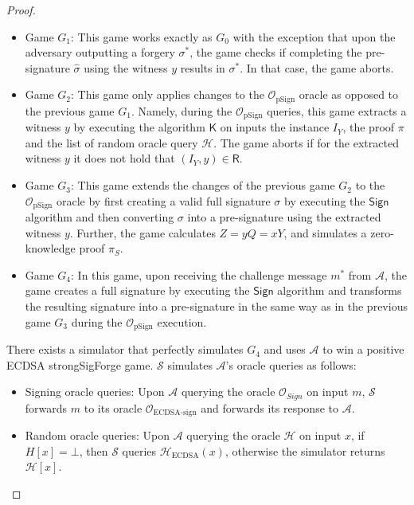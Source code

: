 \documentclass{llncs}
\begin{document}
\begin{proof}
\begin{itemize}
\item Game $G_1$: This game works exactly as $G_0$ with the exception that upon the adversary outputting a forgery $\sigma^*$, the game checks if completing the pre-signature $\hat{\sigma}$ using the witness $y$ results in $\sigma^*$. In that case, the game aborts. 

\item Game $G_2$: This game only applies changes to the $\mathcal{O}_{\text{pSign}}$ oracle as opposed to the previous game $G_1$. Namely, during the $\mathcal{O}_{\text{pSign}}$ queries, this game extracts a witness $y$ by executing the algorithm $\mathsf{K}$ on inputs the instance $I_Y$, the proof $\pi$ and the list of random oracle query $\mathcal{H}$. The game aborts if for the extracted witness $y$ it does not hold that $(I_Y, y) \in \mathsf{R}$.

\item Game $G_3$: This game extends the changes of the previous game $G_2$ to the $\mathcal{O}_{\text{pSign}}$ oracle by first creating a valid full signature $\sigma$ by executing the $\mathsf{Sign}$ algorithm and then converting $\sigma$ into a pre-signature using the extracted witness $y$. Further, the game calculates $Z=yQ=xY$, and simulates a zero-knowledge proof $\pi_S$. 

\item Game $G_4$: In this game, upon receiving the challenge message $m^*$ from $\mathcal{A}$, the game creates a full signature by executing the $\mathsf{Sign}$ algorithm and transforms the resulting signature into a pre-signature in the same way as in the previous game $G_3$ during the $\mathcal{O}_{\text{pSign}}$ execution.
\end{itemize}
There exists a simulator that perfectly simulates $G_4$ and uses $\mathcal{A}$ to win a positive  ECDSA strongSigForge game. $\mathcal{S}$ simulates $\mathcal{A}$'s oracle queries as follows:

\begin{itemize}
\item Signing oracle queries: Upon $\mathcal{A}$ querying the oracle $\mathcal{O}_{Sign}$ on input $m$, $\mathcal{S}$ forwards $m$ to its oracle $\mathcal{O}_{\text{ECDSA-sign}}$ and forwards its response to $\mathcal{A}$.

\item Random oracle queries: Upon $\mathcal{A}$ querying the oracle $\mathcal{H}$ on input $x$, if $H [x] = \bot$, then $\mathcal{S}$ queries $\mathcal{H}_{\text{ECDSA}}(x)$, otherwise the simulator returns $\mathcal{H}[x]$.


\end{itemize}
\end{proof}
\end{document}
